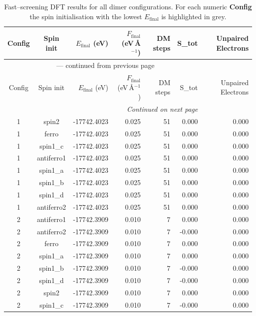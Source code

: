 
\begin{longtable}{@{}ccrrrrr@{}}
\caption{Fast–screening DFT results for all dimer configurations.
         For each numeric \textbf{Config} the spin initialisation with the
         lowest $E_{\mathrm{final}}$ is highlighted in grey.}\label{tab:dimer_full}\\
\toprule
Config & Spin init & $E_{\mathrm{final}}$ (eV) &
$F_{\mathrm{final}}$ (eV\,\AA$^{-1}$) & DM steps & S_{tot} & Unpaired Electrons\\
\midrule
\endfirsthead
\multicolumn{6}{c}{{\tablename}~\thetable{} — continued from previous page}\\
\toprule
Config & Spin init & $E_{\mathrm{final}}$ (eV) &
$F_{\mathrm{final}}$ (eV\,\AA$^{-1}$) & DM steps & S_{tot} & Unpaired Electrons\\
\midrule
\endhead
\midrule
\multicolumn{6}{r}{\emph{Continued on next page}}\\
\endfoot
\bottomrule
\endlastfoot
\rowcolor{gray!20} 1 & spin2 & -17742.4023 & 0.025 & 51 & 0.000 & 0.000 \\
1 & ferro & -17742.4023 & 0.025 & 51 & 0.000 & 0.000 \\
1 & spin1\_c & -17742.4023 & 0.025 & 51 & 0.000 & 0.000 \\
1 & antiferro1 & -17742.4023 & 0.025 & 51 & 0.000 & 0.000 \\
1 & spin1\_a & -17742.4023 & 0.025 & 51 & 0.000 & 0.000 \\
1 & spin1\_b & -17742.4023 & 0.025 & 51 & 0.000 & 0.000 \\
1 & spin1\_d & -17742.4023 & 0.025 & 51 & 0.000 & 0.000 \\
1 & antiferro2 & -17742.4023 & 0.025 & 51 & 0.000 & 0.000 \\
\rowcolor{gray!20} 2 & antiferro1 & -17742.3909 & 0.010 & 7 & 0.000 & 0.000 \\
2 & antiferro2 & -17742.3909 & 0.010 & 7 & -0.000 & 0.000 \\
2 & ferro & -17742.3909 & 0.010 & 7 & 0.000 & 0.000 \\
2 & spin1\_a & -17742.3909 & 0.010 & 7 & 0.000 & 0.000 \\
2 & spin1\_b & -17742.3909 & 0.010 & 7 & -0.000 & 0.000 \\
2 & spin1\_d & -17742.3909 & 0.010 & 7 & -0.000 & 0.000 \\
2 & spin2 & -17742.3909 & 0.010 & 7 & 0.000 & 0.000 \\
2 & spin1\_c & -17742.3909 & 0.010 & 7 & -0.000 & 0.000 \\

\end{longtable}
